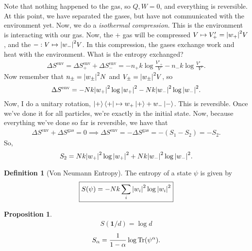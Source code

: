 \documentclass{book}
\theoremstyle{definition}
\newtheorem{defn}{Definition}[section]
\newtheorem{prop}{Proposition}[section]
\newcommand{\al}{\alpha}
\newcommand{\f}[2]{\frac{#1}{#2}}
\begin{document}
Note that nothing happened to the gas, so $Q,W =0$, and everything is reversible. At this point, we have separated the gases, but have not communicated with the environment yet. Now, we do a \textit{isothermal compression}. This is the environment is interacting with our gas. Now, the $+$ gas will be compressed $V \mapsto V'_+ = \abs{w_+}^2 V$, and the $-: V \mapsto \abs{w_-}^2V$. In this compression, the gases exchange work and heat with the environment. What is the entropy exchanged?
\begin{align}
\Delta S^\text{env} = \Delta S_+^\text{env} + \Delta S_-^\text{env}  = -n_+ k \log \f{V'_+}{V} - n_- k \log \f{V'_-}{V}.
\end{align}
Now remember that $n_\pm = \abs{w_\pm}^2N$ and $V_\pm = \abs{w_\pm}^2V$, so 
\begin{align}
\Delta S^\text{env} = -Nk \abs{w_+}^2 \log \abs{w_+}^2-Nk \abs{w_-}^2 \log \abs{w_-}^2.
\end{align}
Now, I do a unitary rotation, $\ket{+}\bra{+} \mapsto w_+\ket{+} + w_-\ket{-}$. This is reversible. Once we've done it for all particles, we're exactly in the initial state. Now, because everything we've done so far is reversible, we have that
\begin{align}
\Delta S^\text{env} + \Delta S^\text{gas} = 0 \implies \Delta S^\text{env} =  - \Delta S^\text{gas} = -(S_1 - S_2) = -S_2.
\end{align}
So, 
\begin{align}
S_2 = Nk \abs{w_+}^2 \log \abs{w_+}^2 + Nk \abs{w_-}^2 \log \abs{w_-}^2.
\end{align}


\begin{defn}[Von Neumann Entropy]
	The entropy of a state $\psi$ is given by
	\begin{align}
	\boxed{S(\psi) = -Nk \sum_i \abs{w_i}^2 \log \abs{w_i}^2}
	\end{align}
\end{defn}

\begin{prop}
	\begin{align}
	S(\bm{1}/d) = \log d
	\end{align}
	\begin{align}
	S_\al = \f{1}{1-\al}\log \Tr(\psi^\al).
	\end{align}
\end{prop}
\end{document}
